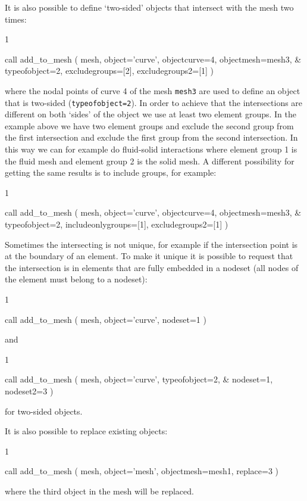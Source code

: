 It is also possible to define `two-sided' objects that intersect with the mesh
two times:
\begin{listing}{1}

  call add_to_mesh ( mesh, object='curve', objectcurve=4, objectmesh=mesh3, &
    typeofobject=2, excludegroups=[2], excludegroups2=[1] )

\end{listing}
where the nodal points of curve 4 of the mesh \texttt{mesh3} are used to define
an object that is two-sided (\texttt{typeofobject=2}). In order to achieve that
the intersections are different on both `sides' of the object we use
at least two
element groups. In the example above we have two element
groups and exclude the second
group from the first intersection and exclude the first group from the second
intersection. In this way we can for example do fluid-solid interactions where
element group 1 is the fluid mesh and element group 2 is the solid mesh. A
different possibility for getting the same results is to include groups, for
example:
\begin{listing}{1}

  call add_to_mesh ( mesh, object='curve', objectcurve=4, objectmesh=mesh3, &
    typeofobject=2, includeonlygroups=[1], excludegroups2=[1] )

\end{listing}

Sometimes the intersecting is not unique, for example if the intersection
point is at the boundary of an element. To make it unique it is possible to
request that the intersection is in elements that are fully embedded in a
nodeset (all nodes of the element must belong to a nodeset):
\begin{listing}{1}

  call add_to_mesh ( mesh, object='curve', nodeset=1 )

\end{listing}
and
\begin{listing}{1}

  call add_to_mesh ( mesh, object='curve', typeofobject=2, &
    nodeset=1, nodeset2=3 )

\end{listing}
for two-sided objects.

It is also possible to replace existing objects:
\begin{listing}{1}

  call add_to_mesh ( mesh, object='mesh', objectmesh=mesh1, replace=3 )
   
\end{listing}
where the third object in the mesh will be replaced.

